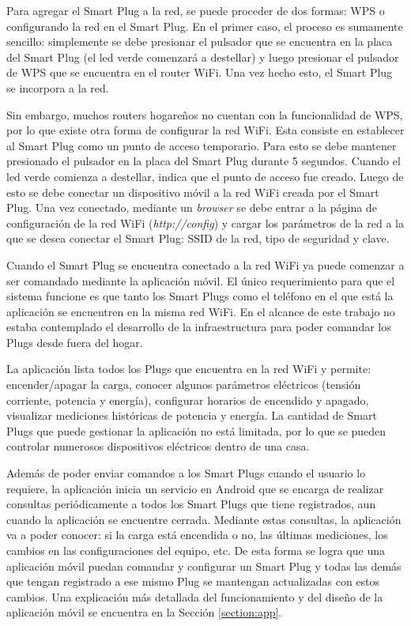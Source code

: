 Para agregar el Smart Plug a la red, se puede proceder de dos formas: WPS o configurando la red en el Smart Plug. En el primer caso, el proceso es sumamente sencillo: simplemente se debe presionar el pulsador que se encuentra en la placa del Smart Plug (el led verde comenzará a destellar) y luego presionar el pulsador de WPS que se encuentra en el router WiFi. Una vez hecho esto, el Smart Plug se incorpora a la red. 

Sin embargo, muchos routers hogareños no cuentan con la funcionalidad de WPS, por lo que existe otra forma de configurar la red WiFi. Esta consiste en establecer al Smart Plug como un punto de acceso temporario. Para esto se debe mantener presionado el pulsador en la placa del Smart Plug durante 5 segundos. Cuando el led verde comienza a destellar, indica que el punto de acceso fue creado. Luego de esto se debe conectar un dispositivo móvil a la red WiFi creada por el Smart Plug. Una vez conectado, mediante un \textit{browser} se debe entrar a la página de configuración de la red WiFi (\textit{http://config}) y cargar los parámetros de la red a la que se desea conectar el Smart Plug: SSID de la red, tipo de seguridad y clave.

Cuando el Smart Plug se encuentra conectado a la red WiFi ya puede comenzar a ser comandado mediante la aplicación móvil. El único requerimiento para que el sistema funcione es que tanto los Smart Plugs como el teléfono en el que está la aplicación se encuentren en la misma red WiFi. En el alcance de este trabajo no estaba contemplado el desarrollo de la infraestructura para poder comandar los Plugs desde fuera del hogar.

La aplicación lista todos los Plugs que encuentra en la red WiFi y permite: encender/apagar la carga, conocer algunos parámetros eléctricos (tensión corriente, potencia y energía), configurar horarios de encendido y apagado, visualizar mediciones históricas de potencia y energía. La cantidad de Smart Plugs que puede gestionar la aplicación no está limitada, por lo que se pueden controlar numerosos dispositivos eléctricos dentro de una casa.

Además de poder enviar comandos a los Smart Plugs cuando el usuario lo requiere, la aplicación inicia un servicio en Android que se encarga de realizar consultas periódicamente a todos los Smart Plugs que tiene registrados, aun cuando la aplicación se encuentre cerrada. Mediante estas consultas, la aplicación va a poder conocer: si la carga está encendida o no, las últimas mediciones, los cambios en las configuraciones del equipo, etc. De esta forma se logra que una aplicación móvil puedan comandar y configurar un Smart Plug y todas las demás que tengan registrado a ese mismo Plug se mantengan actualizadas con estos cambios. Una explicación más detallada del funcionamiento y del diseño de la aplicación móvil se encuentra en la Sección \ref{section:app}.

